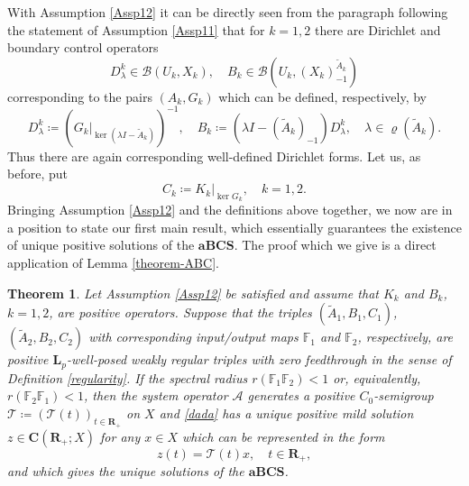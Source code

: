 \documentclass[a4paper,11pt,reqno]{amsart}
\def\la{\lambda}
\def\calB{{\calB}}
\def\calT{{\mathcal{T}}}
\def\calB{{\mathcal{B}}}
\def\calA{{\mathcal{A}}}
\def\R{\mathbf{R}}
\def\F{\mathbb F}
\newtheorem{theorem}{Theorem}[section]
\theoremstyle{plain}
\numberwithin{equation}{section}
\begin{document}
With Assumption \ref{Assp12} it can be directly seen from the paragraph following the statement of Assumption \ref{Assp11} that for $k=1,2$ there are Dirichlet and boundary control operators 
\begin{equation*}
D_\la^k\in \calB(U_k,X_k),\quad B_k\in\calB(U_k,(X_k)_{-1}^{\tilde{A}_k})
\end{equation*}
corresponding to the pairs $(A_k,G_k)$ which can be defined, respectively, by
\begin{equation*}
D_\la^k\coloneqq (G_k|_{\ker(\la I-\tilde{A}_k)})^{-1},\quad B_k\coloneqq (\la I-(\tilde{A}_k)_{-1})D_\la^k,\quad \la\in \varrho(\tilde{A}_k).
\end{equation*}
Thus there are again corresponding well-defined Dirichlet forms. Let us, as before, put
\begin{equation*}
C_k\coloneqq K_k\vert_{\ker{G}_k},\quad k=1,2.
\end{equation*}
Bringing Assumption \ref{Assp12} and the definitions above together, we now are in a position to state our first main result, which essentially guarantees the existence of unique positive solutions of the $\mathbf{aBCS}$. The proof which we give is a direct application of Lemma \ref{theorem-ABC}. 
\begin{theorem}\label{theorem-dynamic-boundary}
Let Assumption \ref{Assp12} be satisfied and assume that $K_k$ and $B_k$, $k=1,2$, are positive operators. Suppose that the triples $(\tilde{A}_1,B_1, C_1)$, $(\tilde{A}_2,B_2,C_2)$ with corresponding input/output maps $\F_{1}$ and $\F_2$, respectively, are positive $\bm{L}_p$-well-posed weakly regular triples with zero feedthrough in the sense of Definition \ref{regularity}. If the spectral radius $r(\F_1\F_2)<1$ or, equivalently, $r(\F_2\F_1)<1$, then the system operator $\calA$ generates a positive $C_0$-semigroup $\calT\coloneqq (\calT(t))_{t\in\R_+}$ on $X$ and \eqref{dada} has a unique positive mild solution $z\in \bm{C}(\R_+;{X})$ for any $x\in X$ which can be represented in the form
\begin{equation}\label{eqwr4532}
{z}(t) =\calT(t)x,\quad t\in\R_+,
\end{equation}
and which gives the unique solutions of the $\mathbf{aBCS}$.
\end{theorem}
\end{document}
